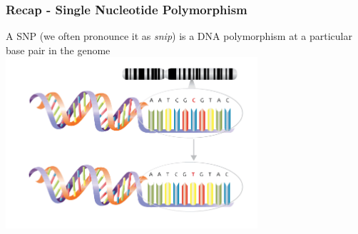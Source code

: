 \documentclass[xcolor=dvipsnames]{beamer}
\begin{document}
\begin{frame}
       \frametitle{Recap - Single Nucleotide Polymorphism}
       A SNP (we often pronounce it as \textit{snip}) is a DNA polymorphism at a particular base pair in the genome\\
       \centering              \includegraphics[keepaspectratio, width  = 0.7\textwidth]{img/SNP}
\end{frame}
\end{document}
